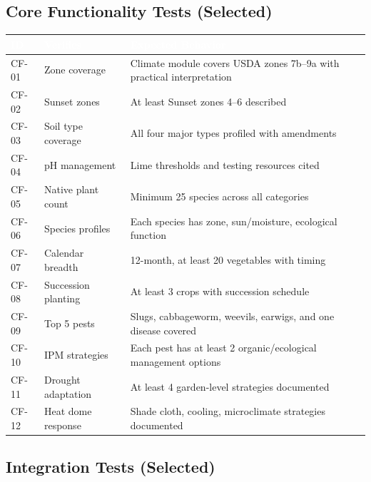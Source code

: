 \documentclass[11pt,letterpaper]{article}
\newcommand{\tableheader}[1]{\textbf{\sffamily\textcolor{white}{#1}}}
\begin{document}
\subsection{Core Functionality Tests (Selected)}

\begin{center}
\begin{tabularx}{\textwidth}{C{1.2cm}L{3.5cm}X}
\toprule
{}
\tableheader{ID} & \tableheader{Verifies} & \tableheader{Expected Behavior} \\
\midrule
CF-01 & Zone coverage & Climate module covers USDA zones 7b--9a with practical interpretation \\
CF-02 & Sunset zones & At least Sunset zones 4--6 described \\
CF-03 & Soil type coverage & All four major types profiled with amendments \\
CF-04 & pH management & Lime thresholds and testing resources cited \\
CF-05 & Native plant count & Minimum 25 species across all categories \\
CF-06 & Species profiles & Each species has zone, sun/moisture, ecological function \\
CF-07 & Calendar breadth & 12-month, at least 20 vegetables with timing \\
CF-08 & Succession planting & At least 3 crops with succession schedule \\
CF-09 & Top 5 pests & Slugs, cabbageworm, weevils, earwigs, and one disease covered \\
CF-10 & IPM strategies & Each pest has at least 2 organic/ecological management options \\
CF-11 & Drought adaptation & At least 4 garden-level strategies documented \\
CF-12 & Heat dome response & Shade cloth, cooling, microclimate strategies documented \\
\bottomrule
\end{tabularx}
\end{center}

\subsection{Integration Tests (Selected)}
\end{document}
